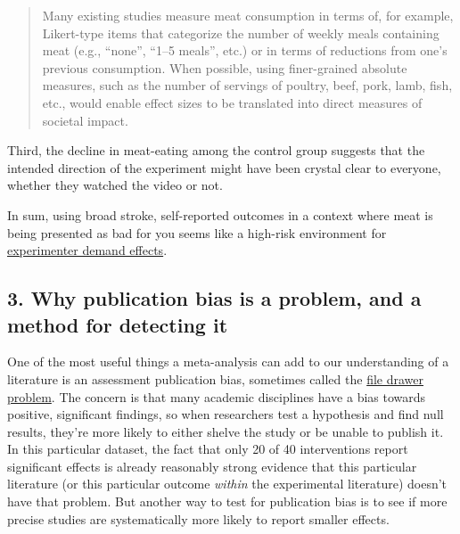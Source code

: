 \documentclass[
  letterpaper,
  DIV=11,
  numbers=noendperiod]{scrartcl}
\begin{document}
\begin{quote}
Many existing studies measure meat consumption in terms of, for example,
Likert-type items that categorize the number of weekly meals containing
meat (e.g., ``none'', ``1--5 meals'', etc.) or in terms of reductions
from one's previous consumption. When possible, using finer-grained
absolute measures, such as the number of servings of poultry, beef,
pork, lamb, fish, etc., would enable effect sizes to be translated into
direct measures of societal impact.
\end{quote}

Third, the decline in meat-eating among the control group suggests that
the intended direction of the experiment might have been crystal clear
to everyone, whether they watched the video or not.

In sum, using broad stroke, self-reported outcomes in a context where
meat is being presented as bad for you seems like a high-risk
environment for
\href{https://www.elgaronline.com/display/edcoll/9781788110556/9781788110556.00031.xml}{experimenter
demand effects}.

\subsection{3. Why publication bias is a problem, and a method for
detecting
it}\label{why-publication-bias-is-a-problem-and-a-method-for-detecting-it}

One of the most useful things a meta-analysis can add to our
understanding of a literature is an assessment publication bias,
sometimes called the
\href{https://psycnet.apa.org/record/1979-27602-001}{file drawer
problem}. The concern is that many academic disciplines have a bias
towards positive, significant findings, so when researchers test a
hypothesis and find null results, they're more likely to either shelve
the study or be unable to publish it. In this particular dataset, the
fact that only 20 of 40 interventions report significant effects is
already reasonably strong evidence that this particular literature (or
this particular outcome \emph{within} the experimental literature)
doesn't have that problem. But another way to test for publication bias
is to see if more precise studies are systematically more likely to
report smaller effects.
\end{document}

